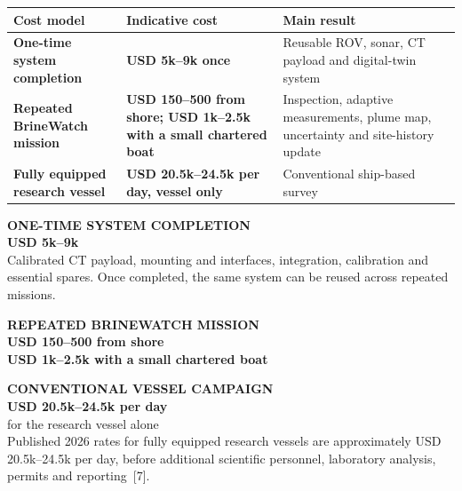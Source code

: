 \documentclass[10pt,a4paper]{article}
\begin{document}
\begin{center}
\small\sffamily
\renewcommand{\arraystretch}{1.34}
\begin{tabularx}{\textwidth}{@{}>{\raggedright\arraybackslash}p{4.0cm}>{\raggedright\arraybackslash}p{4.0cm}>{\raggedright\arraybackslash}X@{}}
\toprule
\textbf{\color{deepblue}Cost model} & \textbf{\color{deepblue}Indicative cost} & \textbf{\color{deepblue}Main result}\\
\midrule
\rowcolor{panelblue}
\textbf{One-time system completion} & \textbf{USD 5k--9k once} & Reusable ROV, sonar, CT payload and digital-twin system\\
\rowcolor{panelteal}
\textbf{Repeated BrineWatch mission} & \textbf{USD 150--500 from shore; USD 1k--2.5k with a small chartered boat} & Inspection, adaptive measurements, plume map, uncertainty and site-history update\\
\rowcolor{panelwarm}
\textbf{Fully equipped research vessel} & \textbf{USD 20.5k--24.5k per day, vessel only} & Conventional ship-based survey\\
\bottomrule
\end{tabularx}
\end{center}

\noindent
\begin{minipage}[t]{0.485\textwidth}
\begin{panel}[height=5.35cm,valign=top]
{\sffamily\bfseries\color{deepblue}ONE-TIME SYSTEM COMPLETION}\\[2pt]
{\sffamily\bfseries\color{deepblue}USD 5k--9k}\\[4pt]
\small Calibrated CT payload, mounting and interfaces, integration, calibration
and essential spares. Once completed, the same system can be reused across repeated missions.

\vspace{5pt}
{\sffamily\bfseries\color{teal}REPEATED BRINEWATCH MISSION}\\[2pt]
{\small\sffamily\bfseries\color{teal}USD 150--500 from shore\\USD 1k--2.5k with a small chartered boat}
\end{panel}
\end{minipage}\hfill
\begin{minipage}[t]{0.485\textwidth}
\begin{warmpanel}[height=5.35cm,valign=top]
{\sffamily\bfseries\color{accent}CONVENTIONAL VESSEL CAMPAIGN}\\[2pt]
{\sffamily\bfseries\color{accent}USD 20.5k--24.5k per day}\\
{\footnotesize\sffamily\color{muted}for the research vessel alone}\\[4pt]
\small Published 2026 rates for fully equipped research vessels are approximately USD
20.5k--24.5k per day, before additional scientific personnel, laboratory analysis, permits and
reporting~[7].
\end{warmpanel}
\end{minipage}
\end{document}
